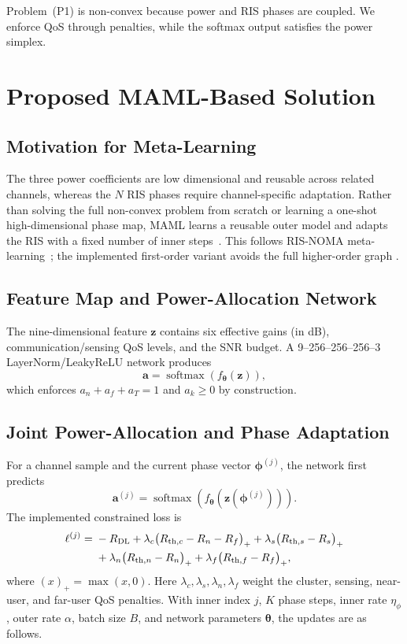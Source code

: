 \documentclass[10pt,journal]{IEEEtran}
\newcommand{\Rdl}{R_{\mathrm{DL}}}
\begin{document}
Problem~(P1) is non-convex because power and RIS phases are coupled. We enforce
QoS through penalties, while the softmax output satisfies the power simplex.

\section{Proposed MAML-Based Solution}
\subsection{Motivation for Meta-Learning}
The three power coefficients are low dimensional and reusable across related
channels, whereas the $N$ RIS phases require channel-specific adaptation.
Rather than solving the full non-convex problem from scratch or learning a
one-shot high-dimensional phase map, MAML learns a reusable outer model and
adapts the RIS with a fixed number of inner steps~\cite{maml,hospedales2022meta}.
This follows RIS-NOMA meta-learning~\cite{zou2023ml}; the implemented
first-order variant avoids the full higher-order graph
\cite{fallah2020maml,ji2022maml}.

\subsection{Feature Map and Power-Allocation Network}\label{sec:feat}
The nine-dimensional feature $\bm z$ contains six effective gains (in dB),
communication/sensing QoS levels, and the SNR budget. A
9--256--256--256--3 LayerNorm/LeakyReLU network produces
\begin{equation}
\bm a=\operatorname{softmax}(f_{\bm\theta}(\bm z)),
\end{equation}
which enforces $a_n+a_f+a_T=1$ and $a_k\geq0$ by construction.

\subsection{Joint Power-Allocation and Phase Adaptation}
For a channel sample and the current phase vector $\bm\phi^{(j)}$, the network
first predicts
\begin{equation}
\bm a^{(j)}=\operatorname{softmax}
\left(f_{\bm\theta}(\bm z(\bm\phi^{(j)}))\right). \label{eq:powerpred}
\end{equation}
The implemented constrained loss is
\begin{align}
\ell^{(j)}={}&-\Rdl
+\lambda_c\big(R_{\mathrm{th},c}-R_n-R_f\big)_+
+\lambda_s\big(R_{\mathrm{th},s}-R_s\big)_+ \notag\\
&+\lambda_n\big(R_{\mathrm{th},n}-R_n\big)_+
+\lambda_f\big(R_{\mathrm{th},f}-R_f\big)_+, \label{eq:sampleloss}
\end{align}
where $(x)_+=\max(x,0)$. Here $\lambda_c,\lambda_s,\lambda_n,\lambda_f$ weight the cluster, sensing,
near-user, and far-user QoS penalties. With inner index $j$, $K$ phase steps,
inner rate $\eta_\phi$, outer rate $\alpha$, batch size $B$, and network
parameters $\bm\theta$, the updates are as follows.
\end{document}
